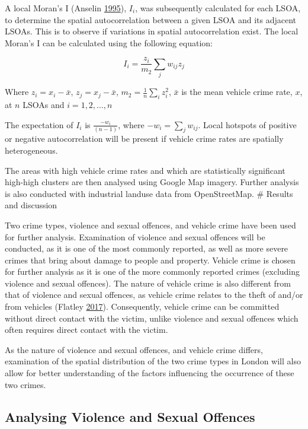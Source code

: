 \documentclass[]{article}
\theoremstyle{definition}
\theoremstyle{definition}
\theoremstyle{definition}
\theoremstyle{remark}
\begin{document}
A local Moran's I (Anselin \protect\hyperlink{ref-Anselin1995}{1995}),
\(I_i\), was subsequently calculated for each LSOA, to determine the
spatial autocorrelation between a given LSOA and its adjacent LSOAs.
This is to observe if variations in spatial autocorrelation exist. The
local Moran's I can be calculated using the following equation:

\[I_i=\frac{z_i}{m_2}\sum_{j}w_{ij}z_j\]

Where \(z_i = x_i-\bar{x}\), \(z_j = x_j-\bar{x}\),
\(m_2=\frac{1}{n}\sum_{i}z_i^2\), \(\bar{x}\) is the mean vehicle crime
rate, \(x\), at \(n\) LSOAs and \(i=1,2,...,n\)

The expectation of \(I_i\) is \(\frac{-w_i}{(n-1)}\), where
\(-w_i=\sum_{j}w_{ij}\). Local hotspots of positive or negative
autocorrelation will be present if vehicle crime rates are spatially
heterogeneous.

The areas with high vehicle crime rates and which are statistically
significant high-high clusters are then analysed using Google Map
imagery. Further analysis is also conducted with industrial landuse data
from OpenStreetMap. \pagebreak
\# Results and discussion

Two crime types, violence and sexual offences, and vehicle crime have
been used for further analysis. Examination of violence and sexual
offences will be conducted, as it is one of the most commonly reported,
as well as more severe crimes that bring about damage to people and
property. Vehicle crime is chosen for further analysis as it is one of
the more commonly reported crimes (excluding violence and sexual
offences). The nature of vehicle crime is also different from that of
violence and sexual offences, as vehicle crime relates to the theft of
and/or from vehicles (Flatley
\protect\hyperlink{ref-Flatley2017}{2017}). Consequently, vehicle crime
can be committed without direct contact with the victim, unlike violence
and sexual offences which often requires direct contact with the victim.

As the nature of violence and sexual offences, and vehicle crime
differs, examination of the spatial distribution of the two crime types
in London will also allow for better understanding of the factors
influencing the occurrence of these two crimes.

\subsection{Analysing Violence and Sexual
Offences}\label{analysing-violence-and-sexual-offences}
\end{document}

